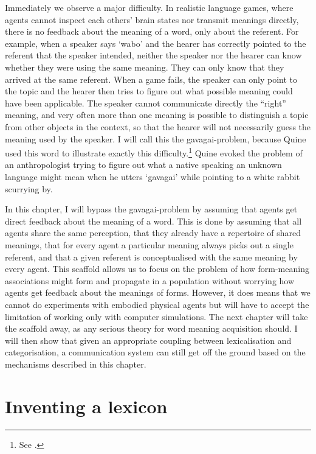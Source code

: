 Immediately we observe a major difficulty. In realistic
language games, where agents cannot inspect each others' 
brain states nor transmit meanings directly, 
there is no feedback about the 
meaning of a word, only about the referent. For example, 
when a speaker says `wabo' and the hearer has correctly pointed 
to the referent that the speaker intended, neither the 
speaker nor the hearer can know whether they were 
using the same meaning. They can only know that they 
arrived at the same referent. When a game fails, the speaker 
can only point to the topic and the hearer then 
tries to figure out what possible meaning 
could have been applicable. The speaker cannot
communicate directly the ``right'' meaning, and very often more 
than one meaning is possible to distinguish a topic from 
other objects in the context, so that the hearer will 
not necessarily guess the meaning used by the speaker. 
I will call this the gavagai-problem, because Quine 
used this word to illustrate exactly this difficulty.\footnote{See \cite[29--30]{Quine:1960}.}
Quine evoked the problem of an anthropologist
trying to figure out what a native speaking an unknown
language might mean when he utters `gavagai' while pointing
to a white rabbit scurrying by. 

In this chapter, I will bypass the gavagai-problem by assuming
that agents get direct feedback about the meaning of a word. 
This is done by assuming that all agents share the 
same perception, that they already have
a repertoire of shared meanings, that for every agent
a particular meaning always picks out a single referent, and 
that a given referent is conceptualised with the same meaning 
by every agent. This scaffold allows us to focus on the problem
of how form-meaning associations might form and propagate in
a population without worrying how agents get feedback about 
the meanings of forms. However, it does means that we cannot 
do experiments with embodied physical agents but will have
to accept the limitation of working only
with computer simulations. 
The next chapter will take the scaffold 
away, as any serious theory for word meaning 
acquisition should. I will then show that given an 
appropriate coupling between lexicalisation and categorisation, 
a communication system can still get off the ground based on 
the mechanisms described in this chapter. 

\section{Inventing a lexicon}

